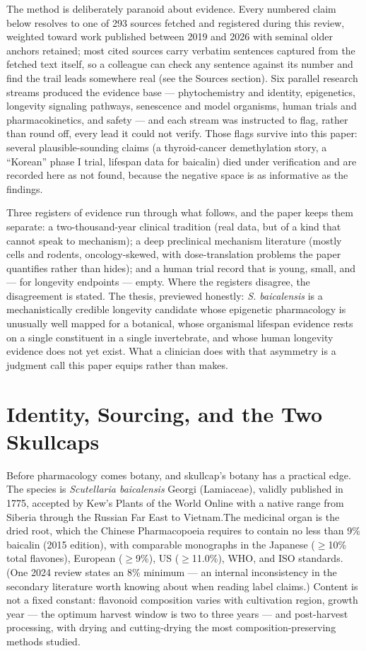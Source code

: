 \documentclass[11pt]{article}
\newcommand{\src}[1]{\allowbreak[#1]}
\begin{document}
The method is deliberately paranoid about evidence. Every numbered claim below resolves to one of 293 sources fetched and registered during this review, weighted toward work published between 2019 and 2026 with seminal older anchors retained; most cited sources carry verbatim sentences captured from the fetched text itself, so a colleague can check any sentence against its number and find the trail leads somewhere real (see the Sources section). Six parallel research streams produced the evidence base --- phytochemistry and identity, epigenetics, longevity signaling pathways, senescence and model organisms, human trials and pharmacokinetics, and safety --- and each stream was instructed to flag, rather than round off, every lead it could not verify. Those flags survive into this paper: several plausible-sounding claims (a thyroid-cancer demethylation story, a ``Korean'' phase I trial, lifespan data for baicalin) died under verification and are recorded here as not found, because the negative space is as informative as the findings.

Three registers of evidence run through what follows, and the paper keeps them separate: a two-thousand-year clinical tradition (real data, but of a kind that cannot speak to mechanism); a deep preclinical mechanism literature (mostly cells and rodents, oncology-skewed, with dose-translation problems the paper quantifies rather than hides); and a human trial record that is young, small, and --- for longevity endpoints --- empty. Where the registers disagree, the disagreement is stated. The thesis, previewed honestly: \textit{S. baicalensis} is a mechanistically credible longevity candidate whose epigenetic pharmacology is unusually well mapped for a botanical, whose organismal lifespan evidence rests on a single constituent in a single invertebrate, and whose human longevity evidence does not yet exist. What a clinician does with that asymmetry is a judgment call this paper equips rather than makes.

\section{Identity, Sourcing, and the Two Skullcaps}
\label{sec:identity}

Before pharmacology comes botany, and skullcap's botany has a practical edge. The species is \textit{Scutellaria baicalensis} Georgi (Lamiaceae), validly published in 1775, accepted by Kew's Plants of the World Online with a native range from Siberia through the Russian Far East to Vietnam.\src{76}\src{98} The medicinal organ is the dried root, which the Chinese Pharmacopoeia requires to contain no less than 9\% baicalin (2015 edition), with comparable monographs in the Japanese ($\geq$10\% total flavones), European ($\geq$9\%), US ($\geq$11.0\%), WHO, and ISO standards.\src{101}\src{100} (One 2024 review states an 8\% minimum --- an internal inconsistency in the secondary literature worth knowing about when reading label claims.\src{54}) Content is not a fixed constant: flavonoid composition varies with cultivation region, growth year --- the optimum harvest window is two to three years --- and post-harvest processing, with drying and cutting-drying the most composition-preserving methods studied.\src{73}\src{104}
\end{document}
